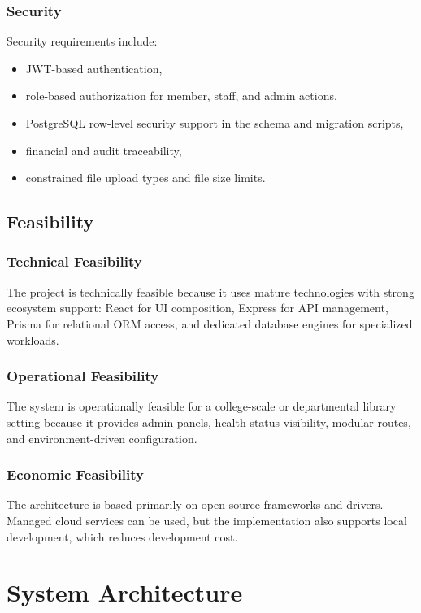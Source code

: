 \documentclass[12pt,a4paper]{report}
\begin{document}
\subsection{Security}
Security requirements include:
\begin{itemize}[leftmargin=1.5em]
    \item JWT-based authentication,
    \item role-based authorization for member, staff, and admin actions,
    \item PostgreSQL row-level security support in the schema and migration scripts,
    \item financial and audit traceability,
    \item constrained file upload types and file size limits.
\end{itemize}

\section{Feasibility}
\subsection{Technical Feasibility}
The project is technically feasible because it uses mature technologies with strong ecosystem support: React for UI composition, Express for API management, Prisma for relational ORM access, and dedicated database engines for specialized workloads.

\subsection{Operational Feasibility}
The system is operationally feasible for a college-scale or departmental library setting because it provides admin panels, health status visibility, modular routes, and environment-driven configuration.

\subsection{Economic Feasibility}
The architecture is based primarily on open-source frameworks and drivers. Managed cloud services can be used, but the implementation also supports local development, which reduces development cost.

\chapter{System Architecture}
\end{document}
